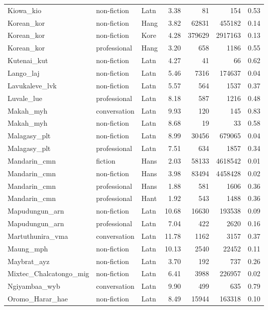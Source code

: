 \begin{longtable}{lllrrrr}
  Kiowa\_kio & non-fiction & Latn & 3.38 & 81 & 154 & 0.53 \\ 
  Korean\_kor & non-fiction & Hang & 3.82 & 62831 & 455182 & 0.14 \\ 
  Korean\_kor & non-fiction & Kore & 4.28 & 379629 & 2917163 & 0.13 \\ 
  Korean\_kor & professional & Hang & 3.20 & 658 & 1186 & 0.55 \\ 
  Kutenai\_kut & non-fiction & Latn & 4.27 & 41 & 66 & 0.62 \\ 
  Lango\_laj & non-fiction & Latn & 5.46 & 7316 & 174637 & 0.04 \\ 
  Lavukaleve\_lvk & non-fiction & Latn & 5.57 & 564 & 1537 & 0.37 \\ 
  Luvale\_lue & professional & Latn & 8.18 & 587 & 1216 & 0.48 \\ 
  Makah\_myh & conversation & Latn & 9.93 & 120 & 145 & 0.83 \\ 
  Makah\_myh & non-fiction & Latn & 8.68 & 19 & 33 & 0.58 \\ 
  Malagasy\_plt & non-fiction & Latn & 8.99 & 30456 & 679065 & 0.04 \\ 
  Malagasy\_plt & professional & Latn & 7.51 & 634 & 1857 & 0.34 \\ 
  Mandarin\_cmn & fiction & Hans & 2.03 & 58133 & 4618542 & 0.01 \\ 
  Mandarin\_cmn & non-fiction & Hans & 3.98 & 83494 & 4458428 & 0.02 \\ 
  Mandarin\_cmn & professional & Hans & 1.88 & 581 & 1606 & 0.36 \\ 
  Mandarin\_cmn & professional & Hant & 1.92 & 543 & 1488 & 0.36 \\ 
  Mapudungun\_arn & non-fiction & Latn & 10.68 & 16630 & 193538 & 0.09 \\ 
  Mapudungun\_arn & professional & Latn & 7.04 & 422 & 2620 & 0.16 \\ 
  Martuthunira\_vma & conversation & Latn & 11.78 & 1162 & 3157 & 0.37 \\ 
  Maung\_mph & non-fiction & Latn & 10.13 & 2540 & 22452 & 0.11 \\ 
  Maybrat\_ayz & non-fiction & Latn & 3.70 & 192 & 737 & 0.26 \\ 
  Mixtec\_Chalcatongo\_mig & non-fiction & Latn & 6.41 & 3988 & 226957 & 0.02 \\ 
  Ngiyambaa\_wyb & conversation & Latn & 9.90 & 499 & 635 & 0.79 \\ 
  Oromo\_Harar\_hae & non-fiction & Latn & 8.49 & 15944 & 163318 & 0.10 \\ 

\end{longtable}
